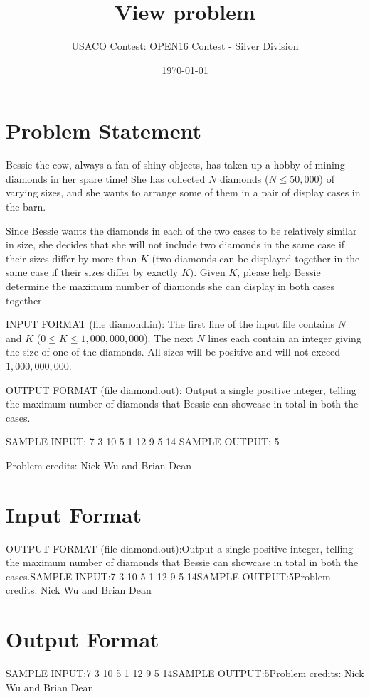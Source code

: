 \documentclass[12pt]{article}
\title{View problem}
\author{USACO Contest: OPEN16 Contest - Silver Division}
\date{\today}
\begin{document}
\maketitle

\section*{Problem Statement}

Bessie the cow, always a fan of shiny objects, has taken up a hobby of mining
diamonds in her spare time!  She has collected $N$ diamonds ($N \leq 50,000$) of
varying sizes, and she wants to arrange some of them in a pair of 
display cases in the barn.  

Since Bessie wants the diamonds in each of the two cases to be relatively similar in 
size, she decides that she will not include two diamonds in the same case if their sizes
differ by more than $K$ (two diamonds can be displayed together in the same case if
their sizes differ by exactly $K$).  Given $K$, please help Bessie determine the
maximum number of diamonds she can display in both cases together.

INPUT FORMAT (file diamond.in):
The first line of the input file contains $N$ and $K$ ($0 \leq K \leq 1,000,000,000$).
The next $N$ lines each contain an integer giving the size of one of the 
diamonds.  All sizes will be positive and will not exceed $1,000,000,000$.

OUTPUT FORMAT (file diamond.out):
Output a single positive integer, telling the maximum number of diamonds that 
Bessie can showcase in total in both the cases.

SAMPLE INPUT:
7 3
10
5
1
12
9
5
14
SAMPLE OUTPUT: 
5


Problem credits: Nick Wu and Brian Dean



\section*{Input Format}
OUTPUT FORMAT (file diamond.out):Output a single positive integer, telling the maximum number of diamonds that 
Bessie can showcase in total in both the cases.SAMPLE INPUT:7 3
10
5
1
12
9
5
14SAMPLE OUTPUT:5Problem credits: Nick Wu and Brian Dean

\section*{Output Format}
SAMPLE INPUT:7 3
10
5
1
12
9
5
14SAMPLE OUTPUT:5Problem credits: Nick Wu and Brian Dean
\end{document}
